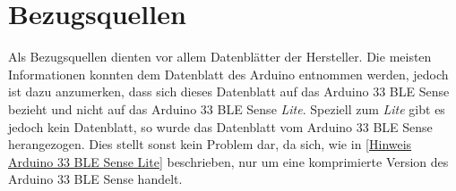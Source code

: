 \section{Bezugsquellen}
Als Bezugsquellen dienten vor allem Datenblätter der Hersteller. Die meisten Informationen konnten dem Datenblatt des Arduino entnommen werden, jedoch ist dazu anzumerken, dass sich dieses Datenblatt auf das Arduino 33 BLE Sense bezieht und nicht auf das Arduino 33 BLE Sense \emph{Lite}. Speziell zum \emph{Lite} gibt es jedoch kein Datenblatt, so wurde das Datenblatt vom Arduino 33 BLE Sense herangezogen. Dies stellt sonst kein Problem dar, da sich, wie in \ref{Hinweis Arduino 33 BLE Sense Lite} beschrieben, nur um eine komprimierte Version des Arduino 33 BLE Sense handelt.


